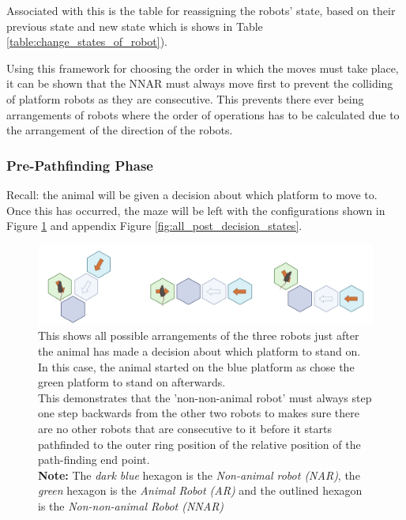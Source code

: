 Associated with this is the table for reassigning the robots' state, based on their previous state and new state which is shows in Table \ref{table:change_states_of_robot}).

Using this framework for choosing the order in which the moves must take place, it can be shown that the NNAR must always move first to prevent the colliding of platform robots as they are consecutive. 
This prevents there ever being arrangements of robots where the order of operations has to be calculated due to the arrangement of the direction of the robots.

\subsubsection{Pre-Pathfinding Phase}
\label{section:pre_pathfinding}

Recall: the animal will be given a decision about which platform to move to. Once this has occurred, the maze will be left with the configurations shown in Figure \ref{fig:post_decision_states} and appendix Figure  \ref{fig:all_post_decision_states}.



\begin{figure}[h]
    \centering
    \includegraphics[scale = 0.5]{images/post_decision_state.png}
    \caption{This shows all possible arrangements of the three robots just after the animal has made a decision about which platform to stand on. In this case, the animal started on the blue platform as chose the green platform to stand on afterwards. \\ This demonstrates that the 'non-non-animal robot' must always step one step backwards from the other two robots to makes sure there are no other robots that are consecutive to it before it starts pathfinded to the outer ring position of the relative position of the path-finding end point.\\ \textbf{Note:} The \textit{dark blue} hexagon is the \textit{Non-animal robot (NAR)}, the \textit{green} hexagon is the \textit{Animal Robot (AR)} and the outlined hexagon is the \textit{Non-non-animal Robot (NNAR)}}
    \label{fig:post_decision_states}
\end{figure}

